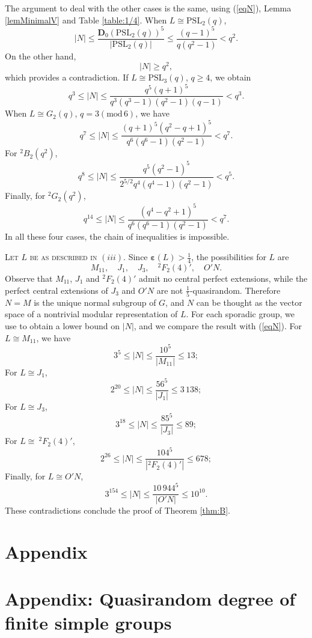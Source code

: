 \documentclass{daj}
\theoremstyle{definition}
\theoremstyle{remark}
\newcommand{\PSL}{\mathrm{PSL}}
\newcommand{\D}{\mathbf{D}}
\renewcommand{\a}{\boldsymbol{\varepsilon}}
\begin{document}
	The argument to deal with the other cases is the same, using (\ref{eqN}), Lemma \ref{lemMinimalV} and Table \ref{table:1/4}.
	When $L \cong \PSL_2(q)$,
	$$ |N| \leq \frac{\D_0(\PSL_2(q))^5}{|\PSL_2(q)|} \leq \frac{(q-1)^5}{q(q^2-1)} < q^2 . $$
	On the other hand,
	$$ |N| \geq q^2 , $$
	which provides a contradiction.
	If $L \cong \PSL_3(q)$, $q \geq 4$, we obtain
	$$ q^3 \leq |N| \leq \frac{q^5(q+1)^5}{q^3(q^3-1)(q^2-1)(q-1)} < q^3 . $$
	When $L \cong G_2(q)$, $q=3(\mathrm{mod}\,6)$, we have
	$$ q^7 \leq |N| \leq  \frac{(q+1)^5(q^2-q+1)^5}{q^6(q^6-1)(q^2-1)} < q^7 . $$
	For $^2B_2(q^2)$, 
	$$ q^8 \leq |N| \leq \frac{q^5(q^2-1)^5}{2^{5/2}q^4 (q^4-1)(q^2-1)} < q^5 . $$
	Finally, for $^2G_2(q^2)$,
	$$  q^{14} \leq |N| \leq \frac{(q^4-q^2+1)^5}{q^6(q^6-1)(q^2-1)} < q^7 . $$
	In all these four cases, the chain of inequalities is impossible.
	
	\smallskip \noindent \textsc{Let $L$ be as described in $(iii)$.}
	Since $\a(L) > \frac{1}{4}$, the possibilities for $L$ are
	$$ M_{11}, \quad
	J_1, \quad
	J_3, \quad 
	^2F_2(4)', \quad
	O'N . $$ 
	Observe that $M_{11}$, $J_1$ and $^2F_2(4)'$ admit no central perfect extensions,
	while the perfect central extensions of $J_3$ and $O'N$ are not $\frac{1}{5}$-quasirandom.
	Therefore $N=M$ is the unique normal subgroup of $G$,
	and $N$ can be thought as the vector space of a nontrivial modular representation of $L$.
	For each sporadic group,
	we use \cite{Jan05} to obtain a lower bound on $|N|$,
	and we compare the result with (\ref{eqN}).
	For $L \cong M_{11}$, we have
	$$ 3^5 \leq |N| \leq \frac{10^5}{|M_{11}|} \leq 13 ; $$
	For $L \cong J_1$, 
	$$ 2^{20} \leq |N| \leq \frac{56^5}{|J_1|} \leq 3 \, 138 ; $$
	For $L \cong J_3$,
	$$ 3^{18} \leq |N| \leq \frac{85^5}{|J_3|} \leq 89 ; $$
	For $L \cong \> ^2F_2(4)'$,
	$$ 2^{26} \leq |N| \leq \frac{104^5}{|^2F_2(4)'|} \leq 678 ; $$
	Finally, for $L \cong O'N$,
	$$ 3^{154} \leq |N| \leq \frac{10\,944^5}{|O'N|} \leq 10^{10} . $$
	These contradictions conclude the proof of Theorem \ref{thm:B}.
    

\appendix %
\section*{Appendix}
\section{Appendix: Quasirandom degree of finite simple groups} \label{appendix} 
\end{document}
